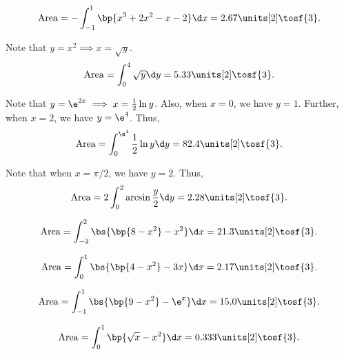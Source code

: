 \begin{solution}
    \begin{ppart}
        \[\area = -\int_{-1}^1 \bp{x^3 + 2x^2 - x - 2} \d x = 2.67 \units[2] \tosf{3}.\]
    \end{ppart}
    \begin{ppart}
        Note that $y = x^2 \implies x = \sqrt{y}$. \[\area = \int_0^4 \sqrt{y} \d y = 5.33 \units[2] \tosf{3}.\]
    \end{ppart}
    \begin{ppart}
        Note that $y = \e^{2x} \implies x = \frac12 \ln y$. Also, when $x = 0$, we have $y = 1$. Further, when $x = 2$, we have $y = \e^4$. Thus, \[\area = \int_0^{\e^4} \frac12 \ln y \d y = 82.4 \units[2] \tosf{3}.\]
    \end{ppart}
    \begin{ppart}
        Note that when $x = \pi/2$, we have $y = 2$. Thus, \[\area = 2 \int_0^2 \arcsin \frac{y}2 \d y = 2.28 \units[2] \tosf{3}.\]
    \end{ppart}
    \begin{ppart}
        \[\area = \int_{-2}^2 \bs{\bp{8-x^2} - x^2} \d x = 21.3 \units[2] \tosf{3}.\]
    \end{ppart}
    \begin{ppart}
        \[\area = \int_0^1 \bs{\bp{4-x^2}-3x} \d x = 2.17 \units[2] \tosf{3}.\]
    \end{ppart}
    \begin{ppart}
        \[\area = \int_{-1}^1 \bs{\bp{9-x^2} - \e^x} \d x = 15.0 \units[2] \tosf{3}.\]
    \end{ppart}
    \begin{ppart}
        \[\area = \int_0^1 \bp{\sqrt{x} - x^2} \d x = 0.333 \units[2] \tosf{3}.\]
    \end{ppart}
\end{solution}


